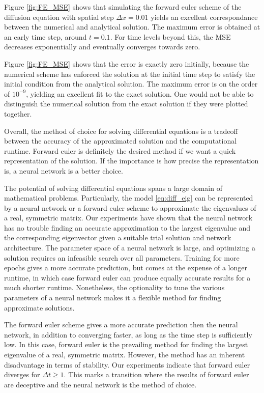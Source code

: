 \documentclass[12pt]{extarticle}
\begin{document}
Figure \ref{fig:FE_MSE} shows that simulating the forward euler scheme of the diffusion equation with spatial step $\Delta x = 0.01$ yields an excellent correspondance between the numerical and analytical solution. The maximum error is obtained at an early time step, around $t = 0.1$. For time levels beyond this, the MSE decreases exponentially and eventually converges towards zero. 

Figure \ref{fig:FE_MSE} shows that the error is exactly zero initially, because the numerical scheme has enforced the solution at the initial time step to satisfy the initial condition from the analytical solution. The maximum error is on the order of $10^{-9}$, yielding an excellent fit to the exact solution. One would not be able to distinguish the numerical solution from the exact solution if they were plotted together.

Overall, the method of choice for solving differential equations is a tradeoff between the accuracy of the approximated solution and the computational runtime. Forward euler is definitely the desired method if we want a quick representation of the solution. If the importance is how precise the representation is, a neural network is a better choice.

The potential of solving differential equations spans a large domain of mathematical problems. Particularly, the model \eqref{eq:diff_eig} can be represented by a neural network or a forward euler scheme to approximate the eigenvalues of a real, symmetric matrix. Our experiments have shown that the neural network has no trouble finding an accurate approximation to the largest eigenvalue and the corresponding eigenvector given a suitable trial solution and network architecture. The parameter space of a neural network is large, and optimizing a solution requires an infeasible search over all parameters. Training for more epochs gives a more accurate prediction, but comes at the expense of a longer runtime, in which case forward euler can produce equally accurate results for a much shorter runtime. Nonetheless, the optionality to tune the various parameters of a neural network makes it a flexible method for finding approximate solutions.

The forward euler scheme gives a more accurate prediction then the neural network, in addition to converging faster, as long as the time step is sufficiently low. In this case, forward euler is the prevailing method for finding the largest eigenvalue of a real, symmetric matrix. However, the method has an inherent disadvantage in terms of stability. Our experiments indicate that forward euler diverges for $\Delta t \ge 1$. This marks a transition where the results of forward euler are deceptive and the neural network is the method of choice.
\end{document}
